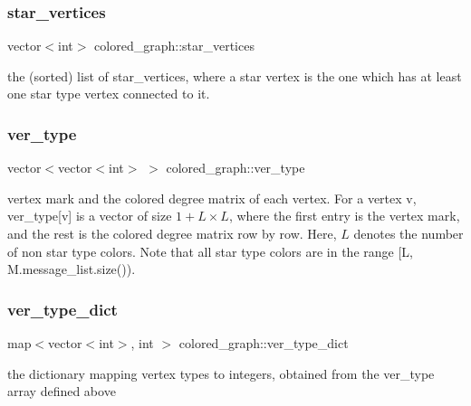 \subsubsection{\texorpdfstring{star\+\_\+vertices}{star\_vertices}}
{\footnotesize\ttfamily vector$<$int$>$ colored\+\_\+graph\+::star\+\_\+vertices}



the (sorted) list of star\+\_\+vertices, where a star vertex is the one which has at least one star type vertex connected to it. 

\mbox{\label{classcolored__graph_a2cc32e7146fa3319f83cfa940f5e1be4}} 
\subsubsection{\texorpdfstring{ver\+\_\+type}{ver\_type}}
{\footnotesize\ttfamily vector$<$vector$<$int$>$ $>$ colored\+\_\+graph\+::ver\+\_\+type}



vertex mark and the colored degree matrix of each vertex. For a vertex v, ver\+\_\+type\mbox{[}v\mbox{]} is a vector of size $1 + L \times L$, where the first entry is the vertex mark, and the rest is the colored degree matrix row by row. Here, $L$ denotes the number of non star type colors. Note that all star type colors are in the range \mbox{[}L, M.\+message\+\_\+list.\+size()). 

\mbox{\label{classcolored__graph_aeb780762429ddac375799f4a45405712}} 
\subsubsection{\texorpdfstring{ver\+\_\+type\+\_\+dict}{ver\_type\_dict}}
{\footnotesize\ttfamily map$<$vector$<$int$>$, int $>$ colored\+\_\+graph\+::ver\+\_\+type\+\_\+dict}



the dictionary mapping vertex types to integers, obtained from the ver\+\_\+type array defined above 

\mbox{\label{classcolored__graph_a491ed2ea1a65118af02ec606c8d44c0a}} 
